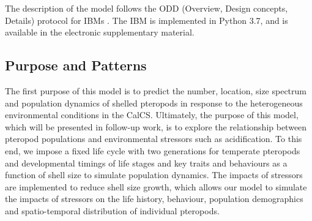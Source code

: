 

The description of the model follows the ODD (Overview, Design concepts, Details) protocol for IBMs \citep{Grimm2006ODD,Grimm2010UpdateODD,Grimm2020SecondUpdateODD}. The IBM is implemented in Python 3.7, and is available in the electronic supplementary material.

\subsection{Purpose and Patterns}\label{sec:purpose}

 The first purpose of this model is to predict the number, location, size spectrum and population dynamics of shelled pteropods in response to the heterogeneous environmental conditions in the CalCS. Ultimately, the purpose of this model, which will be presented in follow-up work, is to explore the relationship between pteropod populations and environmental stressors such as acidification. To this end, we impose a fixed life cycle with two generations for temperate pteropods \citep{Wang2017Lifecycle} and developmental timings of life stages and key traits and behaviours \citep[e.g. protoconch, parapodia, onset of diel vertical migration, and maturity; ][]{Howes2014Lab,Thabet2015Lifestages} as a function of shell size to simulate population dynamics. The impacts of stressors are implemented to reduce shell size growth, which allows our model to simulate the impacts of stressors on the life history, behaviour, population demographics and spatio-temporal distribution of individual pteropods.
 

 
 
 
 

